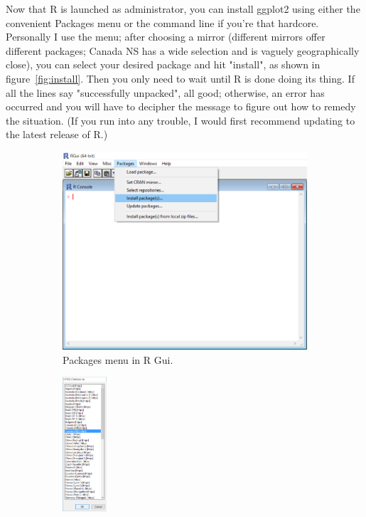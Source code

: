 \documentclass{report}
\begin{document}
		Now that R is launched as administrator, you can install ggplot2 using either the convenient Packages menu or the command line if you're that hardcore. Personally I use the menu; after choosing a mirror (different mirrors offer different packages; Canada NS has a wide selection and is vaguely geographically close), you can select your desired package and hit "install", as shown in figure~\ref{fig:install}. Then you only need to wait until R is done doing its thing. If all the lines say "successfully unpacked", all good; otherwise, an error has occurred and you will have to decipher the message to figure out how to remedy the situation. (If you run into any trouble, I would first recommend updating to the latest release of R.)
		\begin{figure}[h]
			\centering
			\begin{subfigure}[b]{0.475\textwidth}
				\centering
				\includegraphics[width=\textwidth]{menu.png}
				\caption{Packages menu in R Gui.}
				\label{fig:menu}
			\end{subfigure}
			\hfill
			\begin{subfigure}[b]{0.475\textwidth}
				\centering
				\includegraphics[height=5cm]{mirror.png}

\end{subfigure}
\end{figure}
\end{document}
